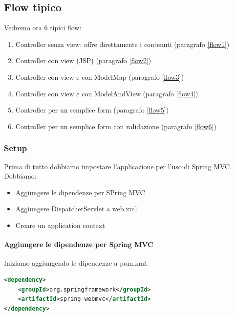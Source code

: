\documentclass[11pt,a4paper]{book}
\begin{document}
\subsection{Flow tipico}
Vedremo ora 6 tipici flow:
\begin{enumerate}
	\item Controller senza view: offre direttamente i contenuti (paragrafo \ref{flow1})
	\item Controller con view (JSP) (paragrafo \ref{flow2})
	\item Controller con view e con ModelMap (paragrafo \ref{flow3})
	\item Controller con view e con ModelAndView (paragrafo \ref{flow4})
	\item Controller per un semplice form (paragrafo \ref{flow5})
	\item Controller per un semplice form con validazione (paragrafo \ref{flow6})
\end{enumerate}

\subsubsection{Setup}
Prima di tutto dobbiamo impostare l'applicazione per l'uso di Spring MVC. Dobbiamo:
\begin{itemize}
	\item Aggiungere le dipendenze per SPring MVC
	\item Aggiungere DispatcherServlet a web.xml
	\item Creare un application context
\end{itemize}
\paragraph{Aggiungere le dipendenze per Spring MVC}
Iniziamo aggiungendo le dipendenze a pom.xml.
\begin{lstlisting}[language = XML]
<dependency>
	<groupId>org.springframework</groupId>
	<artifactId>spring-webmvc</artifactId>
</dependency>
\end{lstlisting}
\end{document}
